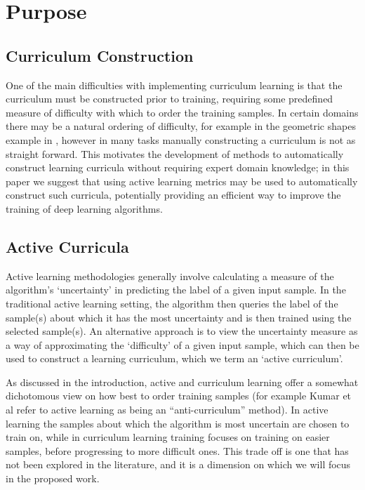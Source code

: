 \documentclass[a4paper,11pt]{article}
\begin{document}

\section{Purpose}
\subsection*{Curriculum Construction}
One of the main difficulties with implementing curriculum learning is that the curriculum must be constructed prior to training, requiring some predefined measure of difficulty with which to order the training samples. In certain domains  there may be a natural ordering of difficulty, for example in the geometric shapes example in \cite{Bengio 09}, however in many tasks manually constructing a curriculum is not as straight forward. This motivates the development of methods to automatically construct learning curricula without requiring expert domain knowledge; in this paper we suggest that using active learning metrics may be used to automatically construct such curricula, potentially providing an efficient way to improve the training of deep learning algorithms.

\subsection*{Active Curricula}
Active learning methodologies generally involve calculating a measure of the algorithm's `uncertainty' in predicting the label of a given input sample. In the traditional active learning setting, the algorithm then queries the label of the sample(s) about which it has the most uncertainty and is then trained using the selected sample(s). An alternative approach is to view the uncertainty measure as a way of approximating the `difficulty' of a given input sample, which can then be used to construct a learning curriculum, which we term an `active curriculum'.

As discussed in the introduction, active and curriculum learning offer a somewhat dichotomous view on how best to order training samples (for example Kumar et al \cite{Koller 2010} refer to active learning as being an ``anti-curriculum'' method). In active learning the samples about which the algorithm is most uncertain are chosen to train on, while in curriculum learning training focuses on training on easier samples, before progressing to more difficult ones. This trade off is one that has not been explored in the literature, and it is a dimension on which we will focus in the proposed work. 
\end{document}
